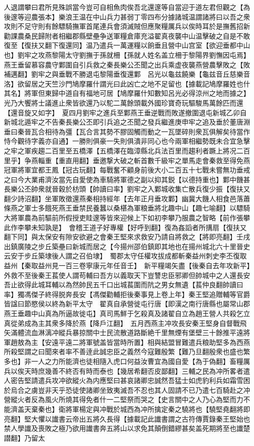 人退謂攀曰君所見殊誤當今豈可自相魚肉俟吾北還邃等自當迎于道左君但觀之【為後邃等迎農張本】樂浪王温在中山兵力甚弱丁零四布分據諸城温謂諸將曰以吾之衆攻則不足守則有餘驃騎撫軍首尾連兵會須滅賊但應聚糧厲兵以俟時耳於是撫舊招新勸課農桑民歸附者相繼郡縣壁壘争送軍糧倉庫充溢翟真夜襲中山温擊破之自是不敢復至【復扶又翻下復還同】温乃遣兵一萬運糧以餉垂且營中山宫室【欲迎垂都中山也】劉牢之攻燕黎陽太守劉撫于孫就柵【孫就人姓名盖立柵于黎陽界劉憮因屯焉】燕王垂留慕容農守鄴圍自引兵救之秦長樂公丕聞之出兵乘虚夜襲燕營農擊敗之【敗補邁翻】劉牢之與垂戰不勝退屯黎陽垂復還鄴　呂光以龜兹饒樂【龜兹音丘慈樂音洛】欲留居之天竺沙門鳩摩羅什謂光曰此凶亡之地不足留也【據載記鳩摩羅姓也什其名】將軍但東歸中道自有福地可居【鳩摩羅什知數知呂光必得涼州之地而據之】光乃大饗將士議進止衆皆欲還乃以駝二萬餘頭載外國珍寶奇玩驅駿馬萬餘匹而還【還音旋又如字】　夏四月劉牢之進兵至鄴燕王垂逆戰而敗遂撤圍退屯新城乙卯自新城北遁牢之不告秦長樂公丕即引兵追之丕聞之發兵繼進庚申牢之追及垂於董唐淵垂曰秦晉瓦合相待為彊【瓦合言其勢不膠固觸而動之一瓦墜碎則衆瓦俱解矣待當作恃今觀待字義亦自通】一勝則俱豪一失則俱潰非同心也今兩軍相繼勢既未合宜急擊之牢之軍疾趨二百里至五橋澤【五橋澤在臨漳縣北兵法百里而趨利者蹶上將况二百里乎】争燕輜重【重直用翻】垂邀撃大破之斬首數千級牢之單馬走會秦救至得免燕冠軍將軍宜都王鳳【冠古玩翻】每戰奮不顧身前後大小二百五十七戰未嘗無功垂戒之曰今大業甫濟汝當先自愛使為車騎將軍德之副以抑其鋭【以德持重也】鄴中饑甚長樂公丕帥衆就晉穀於枋頭【帥讀曰率】劉牢之入鄴城收集亡散兵復少振【復扶又翻少詩沼翻】坐軍敗徵還燕秦相持經年【去年正月垂攻鄴】幽冀大饑人相食邑落蕭條燕之軍士多餓死燕王垂禁民養蠶以桑椹為軍粮垂將北趣中山【趣七喻翻】以驃騎大將軍農為前驅前所假授吏眭邃等皆來迎候上下如初李攀乃服農之智略【前作張攀此作李攀未知孰是】　會稽王道子好專權【好呼到翻】復為姦謟者所搆扇【復扶又翻下同】與太保安有隙安欲避之會秦王堅來求救安乃請自將救之【將即亮翻】壬戌出鎮廣陵之步丘築壘曰新城而居之【今揚州邵伯鎮即其地也在揚州城北六十里晉史云安于步丘築埭後人謂之召伯埭】　蜀郡太守任權攻拔成都斬秦益州刺史李丕復取益州【秦取益州見一百三卷寧康元年任音壬】　新平糧竭矢盡【後秦自去年攻新平】外救不至後秦王萇使人謂苟輔曰吾方以義取天下豈讐忠臣邪卿但帥城中之人還長安吾止欲得此城耳輔以為然帥民五千口出城萇圍而阬之男女無遺【萇仲良翻帥讀曰率】獨馮傑子終得脱奔長安【馮傑勸輔拒後秦事見上卷上年】秦王堅追贈輔等官爵皆諡曰節愍侯以終為新平太守　翟真自承營徙屯行唐【即漢之南行唐縣也屬常山郡燕王垂趣中山真為所逼故徙屯】真司馬鮮于乞殺真及諸翟自立為趙王營人共殺乞立真從弟成為主其衆多降於燕【降戶江翻】　五月西燕主冲攻長安秦王堅身自督戰飛矢滿體流血淋漓冲縱兵暴掠關中士民流散道路斷絶千里無煙有堡壁三十餘推平遠將軍趙敖為主【安遠平遠二將軍號盖皆當時所置】相與結盟冒難遣兵粮助堅多為西燕所殺堅謂之曰聞來者率不善逹此誠忠臣之義然今寇難殷繁【難乃旦翻殷衆也盛也繁多也】非一人之力所能濟也徒相隨入虎口何益汝曹宜為國自愛【為于偽翻】畜糧厲兵以俟天時庶幾善不終否有時而泰也【幾居希翻否皮鄙翻】三輔之民為冲所畧者遣人密告堅請遣兵攻冲欲縱火為内應堅曰甚哀諸卿忠誠然吾猛士如虎豹利兵如霜雪困於烏合之虜豈非天乎恐徒使諸卿坐致夷滅吾不忍也其人固請不已乃遣七百騎赴之冲營縱火者反為風火所燒其得免者什一二堅祭而哭之【史言關中之人乃心為堅而力不能濟盖天棄秦也】衛將軍楊定與冲戰於城西為冲所擒定秦之驍將也【驍堅堯翻將即亮翻】堅大懼以䜟書云帝出五將久長得【據載記此䜟書謂之古符傳賈錄秦王堅始也禁人學䜟及喪敗之極乃欲用䜟書奔五將山以求免其顛倒錯繆甚矣盖死期將至也䜟楚譛翻】乃留太